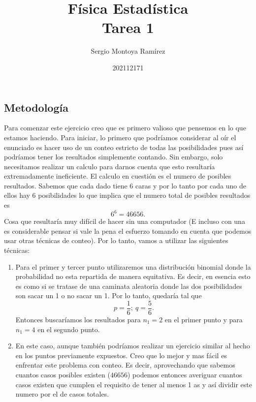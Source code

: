 \documentclass{report}
\title{\Huge{Física Estadística}\\Tarea 1}
\author{\huge{Sergio Montoya Ramírez}}
\date{202112171}
\begin{document}
\maketitle
\newpage%
\tableofcontents
\pagebreak

\chapter{}

\section*{Metodología}

Para comenzar este ejercicio creo que es primero valioso que pensemos en lo que estamos haciendo. Para iniciar, lo primero que podríamos considerar al oír el enunciado es hacer uso de un conteo estricto de todas las posibilidades pues así podríamos tener los resultados simplemente contando. Sin embargo, solo necesitamos realizar un calculo para darnos cuenta que esto resultaría extremadamente ineficiente. El calculo en cuestión es el numero de posibles resultados. Sabemos que cada dado tiene 6 caras y por lo tanto por cada uno de ellos hay 6 posibilidades lo que implica que el numero total de posibles resultados es \[
6^{6} = 46656
.\] Cosa que resultaría muy difícil de hacer sin una computador (E incluso con una es considerable pensar si vale la pena el esfuerzo tomando en cuenta que podemos usar otras técnicas de conteo). Por lo tanto, vamos a utilizar las siguientes técnicas:

\begin{enumerate}
  \item Para el primer y tercer punto utilizaremos una distribución binomial donde la probabilidad no esta repartida de manera equitativa. Es decir, en esencia esto es como si se tratase de una caminata aleatoria donde las dos posibilidades son sacar un 1 o no sacar un 1. Por lo tanto, quedaría tal que \[
  p = \frac{1}{6};\ q = \frac{5}{6}
  .\] Entonces buscaríamos los resultados para $n_1 = 2$ en el primer punto y para $n_1 = 4$ en el segundo punto.
\item En este caso, aunque también podríamos realizar un ejercicio similar al hecho en los puntos previamente expuestos. Creo que lo mejor y mas fácil es enfrentar este problema con conteo. Es decir, aprovechando que sabemos cuantos casos posibles existen ($46656$) podemos entonces averiguar cuantos casos existen que cumplen el requisito de tener al menos 1 as y así dividir este numero por el de casos totales.
\end{enumerate}
\end{document}
